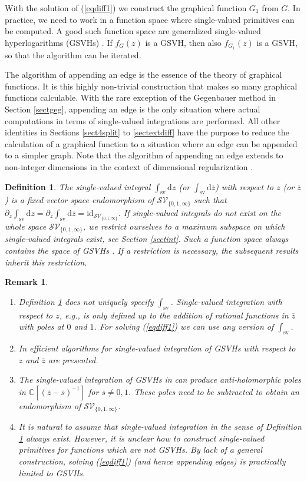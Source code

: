 \documentclass[oneside]{amsart}
\newcommand{\CC}{{\mathbb C}}
\newcommand{\dd}{\mathrm{d}}
\newcommand{\sss}{{\overline{s}}}
\newcommand{\zz}{{\overline{z}}}
\newcommand{\sS}{\mathcal{S}}
\newcommand{\sV}{\mathcal{V}}
\newcommand{\intsv}{\int_\mathrm{sv}}
\theoremstyle{plain}
\newtheorem{remark}[thm]{Remark}
\newtheorem{defn}[thm]{Definition}
\begin{document}
With the solution of (\ref{eqdiff1}) we construct the graphical function $G_1$ from $G$. In practice, we need to work in a function space where single-valued primitives can
be computed. A good such function space are generalized single-valued hyperlogarithms (GSVHs) \cite{GSVH}.
If $f_G(z)$ is a GSVH, then also $f_{G_1}(z)$ is a GSVH, so that the algorithm can be iterated.

The algorithm of appending an edge is the essence of the theory of graphical functions. It is this highly non-trivial construction that makes so many graphical functions
calculable. With the rare exception of the Gegenbauer method in Section \ref{sectgeg}, appending an edge is the only situation where actual computations in terms of single-valued
integrations are performed. All other identities in Sections \ref{sect4split} to \ref{sectextdiff} have the purpose to reduce the calculation of a graphical function to a situation
where an edge can be appended to a simpler graph. Note that the algorithm of appending an edge extends to non-integer dimensions in the context of dimensional regularization \cite{numfunct,7loops}.

\begin{defn}\label{defintsv}
The single-valued integral $\intsv\dd z$ (or $\intsv\dd\zz$) with respect to $z$ (or $\zz$) is a fixed vector space endomorphism of $\sS\sV_{\{0,1,\infty\}}$ such that
$\partial_z\intsv \dd z=\partial_\zz\intsv \dd\zz=\mathrm{id}_{\sS\sV_{\{0,1,\infty\}}}$.
If single-valued integrals do not exist on the whole space $\sS\sV_{\{0,1,\infty\}}$, we restrict ourselves to a maximum subspace on which single-valued integrals exist, see Section \ref{sectint}.
Such a function space always contains the space of GSVHs \cite{GSVH}. If a restriction is necessary, the subsequent results inherit this restriction.
\end{defn}

\begin{remark}\mbox{}
\begin{enumerate}
\item Definition \ref{defintsv} does not uniquely specify $\intsv$. Single-valued integration with respect to $z$, e.g., is only defined up to the addition of rational functions in $\zz$
with poles at $0$ and $1$. For solving (\ref{eqdiff1}) we can use any version of $\intsv$.
\item In \cite{GSVH} efficient algorithms for single-valued integration of GSVHs with respect to $z$ and $\zz$ are presented.
\item The single-valued integration of GSVHs in \cite{Shlog} can produce anti-holomorphic poles in $\CC[(\zz-\sss)^{-1}]$ for $\sss\neq0,1$.
These poles need to be subtracted to obtain an endomorphism of $\sS\sV_{\{0,1,\infty\}}$.
\item It is natural to assume that single-valued integration in the sense of Definition \ref{defintsv} always exist. However, it is unclear how to construct single-valued primitives
for functions which are not GSVHs. By lack of a general construction, solving (\ref{eqdiff1}) (and hence appending edges) is practically limited to GSVHs.
\end{enumerate}
\end{remark}
\end{document}
